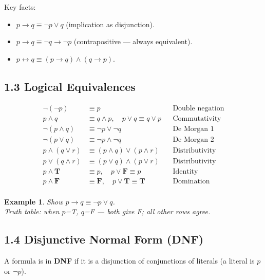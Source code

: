 \documentclass[11pt]{article}
\newtheorem{example}[definition]{Example}
\newcommand{\lra}{\leftrightarrow}
\newcommand{\ra}{\rightarrow}
\begin{document}
Key facts:
\begin{itemize}[nosep]
  \item $p\ra q \equiv \neg p\lor q$ (implication as disjunction).
  \item $p\ra q \equiv \neg q\ra\neg p$ (contrapositive — always equivalent).
  \item $p\lra q\equiv (p\ra q)\land(q\ra p)$.
\end{itemize}

\subsection*{1.3 Logical Equivalences}

\begin{tcolorbox}[keybox={Key equivalences}]
\begin{align*}
\neg(\neg p)&\equiv p & &\text{Double negation}\\
p\land q &\equiv q\land p,\quad p\lor q\equiv q\lor p & &\text{Commutativity}\\
\neg(p\land q)&\equiv \neg p\lor\neg q & &\text{De Morgan 1}\\
\neg(p\lor q)&\equiv \neg p\land\neg q & &\text{De Morgan 2}\\
p\land(q\lor r)&\equiv (p\land q)\lor(p\land r) & &\text{Distributivity}\\
p\lor(q\land r)&\equiv (p\lor q)\land(p\lor r) & &\text{Distributivity}\\
p\land\mathbf{T}&\equiv p,\quad p\lor\mathbf{F}\equiv p & &\text{Identity}\\
p\land\mathbf{F}&\equiv\mathbf{F},\quad p\lor\mathbf{T}\equiv\mathbf{T} & &\text{Domination}\\
\end{align*}
\end{tcolorbox}

\begin{example}
Show $p\ra q\equiv\neg p\lor q$.\\
Truth table: when $p$=T, $q$=F — both give F; all other rows agree. \checkmark
\end{example}

\subsection*{1.4 Disjunctive Normal Form (DNF)}

A formula is in \textbf{DNF} if it is a disjunction of conjunctions of literals (a literal is $p$ or $\neg p$).
\end{document}
